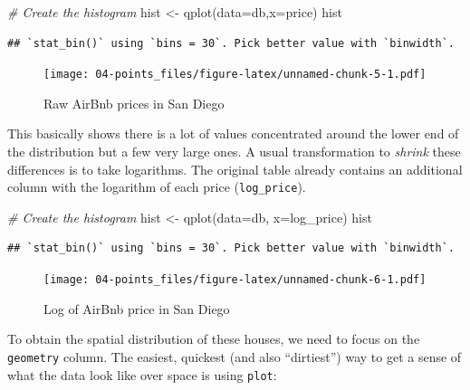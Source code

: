 \documentclass[
]{book}
\newenvironment{Shaded}{\begin{snugshade}}{\end{snugshade}}
\newcommand{\AttributeTok}[1]{\textcolor[rgb]{0.77,0.63,0.00}{#1}}
\newcommand{\CommentTok}[1]{\textcolor[rgb]{0.56,0.35,0.01}{\textit{#1}}}
\newcommand{\FunctionTok}[1]{\textcolor[rgb]{0.00,0.00,0.00}{#1}}
\newcommand{\NormalTok}[1]{#1}
\newcommand{\OtherTok}[1]{\textcolor[rgb]{0.56,0.35,0.01}{#1}}
\begin{document}
\begin{Shaded}
\begin{Highlighting}[]
\CommentTok{\# Create the histogram}
\NormalTok{hist }\OtherTok{\textless{}{-}} \FunctionTok{qplot}\NormalTok{(}\AttributeTok{data=}\NormalTok{db,}\AttributeTok{x=}\NormalTok{price)}
\NormalTok{hist}
\end{Highlighting}
\end{Shaded}

\begin{verbatim}
## `stat_bin()` using `bins = 30`. Pick better value with `binwidth`.
\end{verbatim}

\begin{figure}
\centering
\texttt{[image: 04-points\_files/figure-latex/unnamed-chunk-5-1.pdf]}
\caption{\label{fig:unnamed-chunk-5}Raw AirBnb prices in San Diego}
\end{figure}

This basically shows there is a lot of values concentrated around the lower end of the distribution but a few very large ones. A usual transformation to \emph{shrink} these differences is to take logarithms. The original table already contains an additional column with the logarithm of each price (\texttt{log\_price}).

\begin{Shaded}
\begin{Highlighting}[]
\CommentTok{\# Create the histogram}
\NormalTok{hist }\OtherTok{\textless{}{-}} \FunctionTok{qplot}\NormalTok{(}\AttributeTok{data=}\NormalTok{db, }\AttributeTok{x=}\NormalTok{log\_price)}
\NormalTok{hist}
\end{Highlighting}
\end{Shaded}

\begin{verbatim}
## `stat_bin()` using `bins = 30`. Pick better value with `binwidth`.
\end{verbatim}

\begin{figure}
\centering
\texttt{[image: 04-points\_files/figure-latex/unnamed-chunk-6-1.pdf]}
\caption{\label{fig:unnamed-chunk-6}Log of AirBnb price in San Diego}
\end{figure}

To obtain the spatial distribution of these houses, we need to focus on the \texttt{geometry} column. The easiest, quickest (and also ``dirtiest'') way to get a sense of what the data look like over space is using \texttt{plot}:
\end{document}
